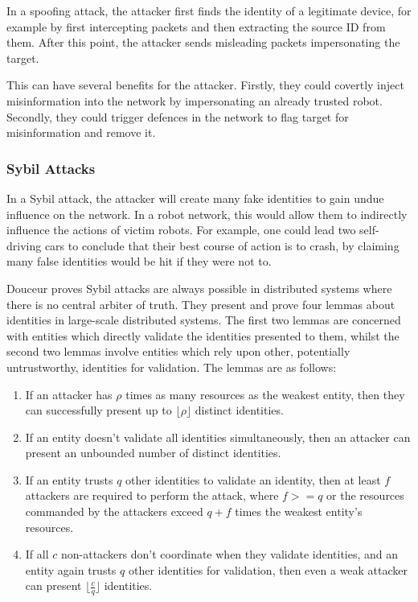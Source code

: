In a spoofing attack, the attacker first finds the identity of a legitimate device, for example by first intercepting packets and then extracting the source ID from them. After this point, the attacker sends misleading packets impersonating the target. 

This can have several benefits for the attacker. Firstly, they could covertly inject misinformation into the network by impersonating an already trusted robot. Secondly, they could trigger defences in the network to flag target for misinformation and remove it.

\subsubsection{Sybil Attacks}
In a Sybil attack, the attacker will create many fake identities to gain undue influence on the network. In a robot network, this would allow them to indirectly influence the actions of victim robots. For example, one could lead two self-driving cars to conclude that their best course of action is to crash, by claiming many false identities would be hit if they were not to.

Douceur \cite{SybilAttack} proves Sybil attacks are always possible in distributed systems where there is no central arbiter of truth. They present and prove four lemmas about identities in large-scale distributed systems. The first two lemmas are concerned with entities which directly validate the identities presented to them, whilst the second two lemmas involve entities which rely upon other, potentially untrustworthy, identities for validation. The lemmas are as follows:


\begin{enumerate}
    \item If an attacker has $\rho$ times as many resources as the weakest entity, then they can successfully present up to $\lfloor\rho\rfloor$ distinct identities.
    \item If an entity doesn't validate all identities simultaneously, then an attacker can present an unbounded number of distinct identities.
    \item If an entity trusts $q$ other identities to validate an identity, then at least $f$ attackers are required to perform the attack, where $f >= q$ or the resources commanded by the attackers exceed $q + f$ times the weakest entity's resources.
    \item If all $c$ non-attackers don't coordinate when they validate identities, and an entity again trusts $q$ other identities for validation, then even a weak attacker can present $\lfloor\frac{c}{q}\rfloor$ identities.
\end{enumerate}

